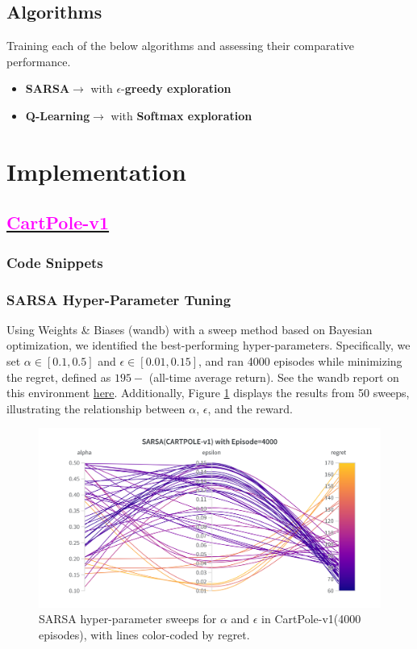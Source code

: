\documentclass[11pt, a4]{article}
\begin{document}
		\subsection{Algorithms}
		Training each of the below algorithms and assessing their comparative performance.
		\begin{itemize}
			\item \textbf{SARSA}$\rightarrow$ with $\epsilon$-\textbf{greedy exploration}
			\item \textbf{Q-Learning}$\rightarrow$ with \textbf{Softmax exploration}
		\end{itemize}
	\section{Implementation}
		\subsection{\href{https://github.com/RitabrataMandal/RL-DA6400-assignment_1/tree/main/cartpole-v1}{\textcolor{magenta}{CartPole-v1}}}
			\subsubsection{Code Snippets}
%				
			\subsubsection{SARSA Hyper-Parameter Tuning}  
			Using Weights \& Biases (wandb) with a sweep method based on Bayesian optimization, we identified the best-performing hyper-parameters. Specifically, we set $\alpha \in [0.1, 0.5]$ and $\epsilon \in [0.01, 0.15]$, and ran 4000 episodes while minimizing the regret, defined as \(195 -\) (all-time average return). See the wandb report on this environment \href{https://api.wandb.ai/links/ee24e009-iitm/0hseqrps}{here}. Additionally, Figure \ref{fig:sarsacartpole-regret} displays the results from 50 sweeps, illustrating the relationship between $\alpha$, $\epsilon$, and the reward.
				\begin{figure}[H]
					\centering
					\includegraphics[width=1\linewidth]{sarsa-hyp-tuning-cartpole.png}
					\caption{SARSA hyper-parameter sweeps for $\alpha$ and $\epsilon$ in CartPole-v1(4000 episodes), with lines color-coded by regret.}
					\label{fig:sarsacartpole-regret}
				\end{figure}
\end{document}

